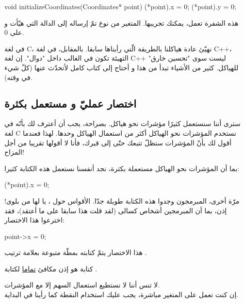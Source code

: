 \begin{Csource}
void initializeCoordinates(Coordinates* point)
{
	(*point).x = 0;
	(*point).y = 0;
}
\end{Csource}

هذه الشفرة تعمل، يمكنك تجريبها. المتغير من نوع
تمّ إرساله إلى الدالة التي هيّأت
و
على 0.

\begin{information}
في لغة \textenglish{C}،
نهيّئ عادة هياكلنا بالطريقة الّتي رأيناها سابقا. بالمقابل، في لغة \textenglish{C++}،
التهيئة تكون في الغالب داخل "دوال".
إن لغة
\textenglish{C++}
ليست سوى "تحسين خارق" للهياكل. كثير من الأشياء تبدأ من هذا و أحتاج إلى كتاب كامل لأتحدّث عنها (كلّ شيء في وقته).
\end{information}

\subsection{اختصار عمليّ و مستعمل بكثرة}

سترى أننا سنستعمل كثيرًا مؤشرات نحو هياكل. بصراحة، يجب أن أعترف لك بأنّه
في لغة \textenglish{C}
نستخدم  المؤشرات نحو الهياكل أكثر من استعمال الهياكل وحدها. لهذا فعندما أقول لك بأنّ المؤشرات ستظلّ تتبعك حتّى إلى قبرك، فأنا لا أقولها تقريبا من أجل المزاح!

بما أن المؤشرات نحو الهياكل مستعملة بكثرة، نجد أنفسنا نستعمل هذه الكتابة كثيرا:
\begin{Csource}
(*point).x = 0;
\end{Csource}

مرّة أخرى، المبرمجون وجدوا هذه الكتابة طويلة جدّا. الأقواس حول
،
يا لها من بلوى! إذن، بما أن المبرمجين أشخاص كسالى (لقد قلت هذا سابقا على ما أعتقد)، فقد اخترعوا هذا الاختصار:

\begin{Csource}
point->x = 0;
\end{Csource}

هذا الاختصار يتمّ كتابته بمطّة
\InlineCode{-}
متبوعة بعلامة ترتيب
\InlineCode{>}.

كتابة
هو إذن مكافئ
\underline{تماما}
لكتابة
.

\begin{warning}
  لا تنس أننا لا نستطيع استعمال السهم إلا مع المؤشرات.\\
إن كنت تعمل على المتغير مباشرة، يجب عليك استخدام النقطة كما رأينا في البداية.
\end{warning}


